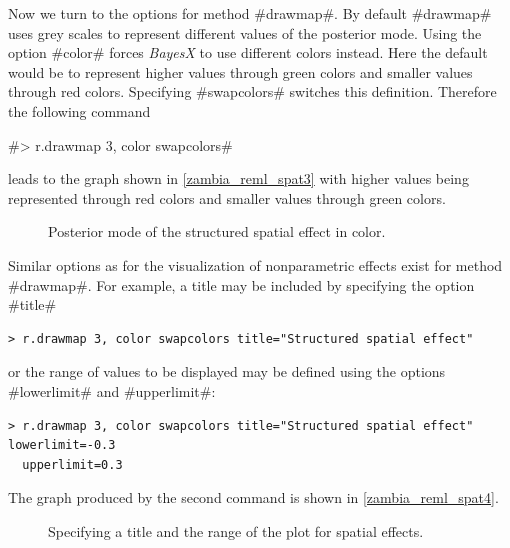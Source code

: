 \documentclass[11pt,a4paper,twoside]{bayesxreport}
\begin{document}
Now we turn to the options for method #drawmap#. By default
#drawmap# uses grey scales to represent different values of the
posterior mode. Using the option #color# forces {\it BayesX} to use
different colors instead. Here the default would be to represent
higher values through green colors and smaller values through red
colors. Specifying #swapcolors# switches this definition. Therefore
the following command

#> r.drawmap 3, color swapcolors#

leads to the graph shown in \autoref{zambia_reml_spat3} with higher
values being represented through red colors and smaller values
through green colors.

\begin{figure}[ht]
\begin{center}
{\it\caption{Posterior mode of the structured spatial effect in
color.\label{zambia_reml_spat3}}}
\end{center}
\end{figure}


Similar options as for the visualization of nonparametric effects
exist for method #drawmap#. For example, a title may be included by
specifying the option #title#

\begin{verbatim}
> r.drawmap 3, color swapcolors title="Structured spatial effect"
\end{verbatim}

or the range of values to be displayed may be defined using the
options #lowerlimit# and #upperlimit#:

\begin{verbatim}
> r.drawmap 3, color swapcolors title="Structured spatial effect" lowerlimit=-0.3
  upperlimit=0.3
\end{verbatim}

The graph produced by the second command is shown in
\autoref{zambia_reml_spat4}.

\begin{figure}[ht]
\begin{center}
{\it\caption{Specifying a title and the range of the plot for
spatial effects.\label{zambia_reml_spat4}}}
\end{center}
\end{figure}

\end{document}
